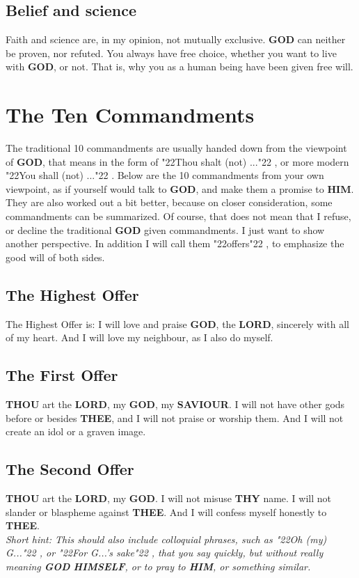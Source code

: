 \documentclass[12pt,a4paper]{article}
\newcommand{\God}[0]{\textbf{GOD}}
\newcommand{\Him}[0]{\textbf{HIM}}
\newcommand{\Himself}[0]{\textbf{HIMSELF}}
\newcommand{\Lord}[0]{\textbf{LORD}}
\newcommand{\Saviour}[0]{\textbf{SAVIOUR}}
\newcommand{\Thee}[0]{\textbf{THEE}}
\newcommand{\Thou}[0]{\textbf{THOU}}
\newcommand{\Thy}[0]{\textbf{THY}}
\newcommand{\q}[1]{\char"22{#1}\char"22 }
\begin{document}
	\subsection{Belief and science}
		Faith and science are,
		in my opinion,
		not mutually exclusive.
		{\God} can neither be proven,
		nor refuted.
		You always have free choice,
		whether you want to live with {\God},
		or not.
		That is,
		why you as a human being have been given free will.
	
	\newpage
	\section{The Ten Commandments}
		The traditional 10 commandments are usually handed down from the viewpoint of {\God},
		that means in the form of \q{Thou shalt (not) ...},
		or more modern \q{You shall (not) ...}.
		Below are the 10 commandments from your own viewpoint,
		as if yourself would talk to {\God},
		and make them a promise to {\Him}.
		They are also worked out a bit better,
		because on closer consideration,
		some commandments can be summarized.
		Of course,
		that does not mean that I refuse,
		or decline the traditional {\God} given commandments.
		I just want to show another perspective.
		In addition I will call them \q{offers},
		to emphasize the good will of both sides.
	
	\subsection{The Highest Offer}
		The Highest Offer is:
		I will love and praise {\God},
		the {\Lord},
		sincerely with all of my heart.
		And I will love my neighbour,
		as I also do myself.
		
	\subsection{The First Offer}
		{\Thou} art the {\Lord},
		my {\God},
		my {\Saviour}.
		I will not have other gods before or besides {\Thee},
		and I will not praise or worship them.
		And I will not create an idol or a graven image.
		
	\subsection{The Second Offer}
		{\Thou} art the {\Lord},
		my {\God}.
		I will not misuse {\Thy} name.
		I will not slander or blaspheme against {\Thee}.
		And I will confess myself honestly to {\Thee}.
		\\
		\textit{Short hint:
		This should also include colloquial phrases,
		such as \q{Oh (my) G...},
		or \q{For G...'s sake},
		that you say quickly,
		but without really meaning {\God} {\Himself},
		or to pray to {\Him},
		or something similar.}
			
\end{document}
